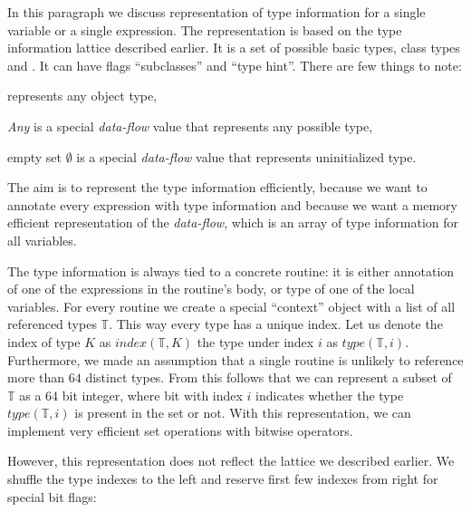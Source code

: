         In this paragraph we discuss representation of 
        type information for a single variable or a single expression. 
        The representation is based on the type information 
        lattice described earlier. It is a set of possible 
        basic types, class types and . It can 
        have flags ``subclasses'' and ``type hint''. 
        There are few things to note:
        \begin{itemize*}
            \item {} represents any object type, 
            \item \emph{Any} is a special \emph{data-flow} value that 
                represents any possible type, 
            \item empty set $\emptyset$  is a special \emph{data-flow} value that 
                represents uninitialized type.
        \end{itemize*}
        
        The aim is to represent the type information efficiently, 
        because we want to annotate every expression with type 
        information and because we want a memory efficient 
        representation of the \emph{data-flow}, which is an 
        array of type information for all variables.
        
        The type information is always tied to a concrete routine: 
        it is either annotation of one of the expressions in 
        the routine's body, or type of one of the local variables. 
        For every routine we create a special ``context'' object 
        with a list of all referenced types $\mathbb{T}$. This way 
        every type has a unique index. Let us denote the index 
        of type $K$ as $\mathit{index}(\mathbb{T}, K)$ the 
        type under index $i$ as $\mathit{type}(\mathbb{T}, i)$.
        Furthermore, we made an assumption that a single routine 
        is unlikely to reference more than $64$ distinct types. 
        From this follows that we can represent a subset of 
        $\mathbb{T}$ as a 64 bit integer, where bit with index 
        $i$ indicates whether the type $\mathit{type}(\mathbb{T}, i)$ 
        is present in the set or not. With this representation, 
        we can implement very efficient set operations with 
        bitwise operators.
        
        However, this representation does not reflect the 
        lattice we described earlier. We shuffle 
        the type indexes to the left and reserve first few 
        indexes from right for special bit flags:
        
